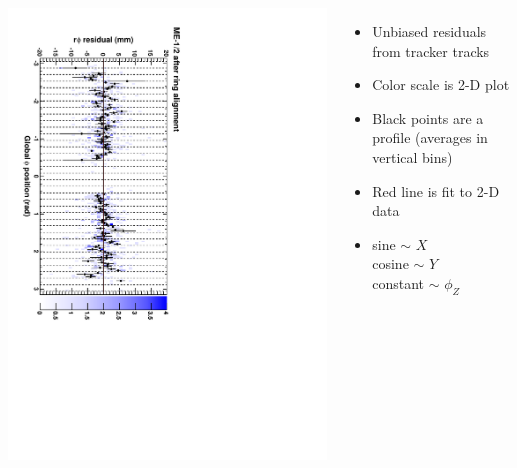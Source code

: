 \documentclass[compress]{beamer}
\begin{document}
\begin{frame}
\begin{columns}
\includegraphics[height=\linewidth, angle=90]{ringfits_after/mem12.pdf}
\begin{itemize}
\item Unbiased residuals from tracker tracks
\item Color scale is 2-D plot
\item Black points are a profile (averages in vertical bins)
\item Red line is fit to 2-D data
\item sine $\sim$ $X$ \\
cosine $\sim$ $Y$ \\
constant $\sim$ $\phi_Z$
\end{itemize}
\end{columns}
\end{frame}
\end{document}
